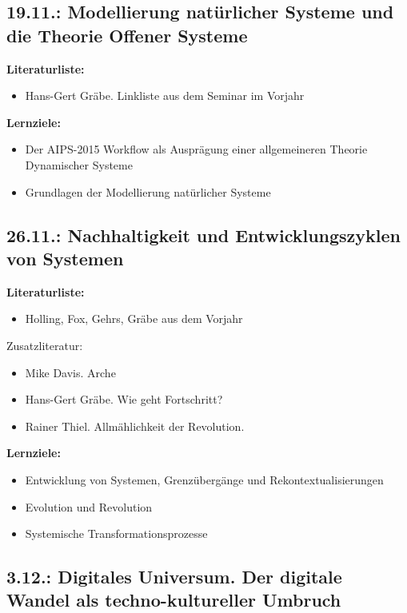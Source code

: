 \documentclass[11pt,a4paper]{article}
\begin{document}
\subsection{19.11.: Modellierung natürlicher Systeme und die Theorie Offener
  Systeme}

\textbf{Literaturliste:}
\begin{itemize}
\item Hans-Gert Gräbe. Linkliste aus dem Seminar im Vorjahr
\end{itemize}

\textbf{Lernziele:}
\begin{itemize}[noitemsep]
\item Der AIPS-2015 Workflow als Ausprägung einer allgemeineren Theorie
  Dynamischer Systeme 
\item Grundlagen der Modellierung natürlicher Systeme
\end{itemize}

\subsection{26.11.: Nachhaltigkeit und Entwicklungszyklen von Systemen}

\textbf{Literaturliste:}
\begin{itemize}[noitemsep]
\item Holling, Fox, Gehrs, Gräbe aus dem Vorjahr
\end{itemize}

Zusatzliteratur:
\begin{itemize}[noitemsep]
\item Mike Davis. Arche
\item Hans-Gert Gräbe. Wie geht Fortschritt?
\item Rainer Thiel. Allmählichkeit der Revolution.
\end{itemize}

\textbf{Lernziele:}
\begin{itemize}[noitemsep]
\item Entwicklung von Systemen, Grenzübergänge und Rekontextualisierungen 
\item Evolution und Revolution
\item Systemische Transformationsprozesse
\end{itemize}

\subsection{3.12.: Digitales Universum. Der digitale Wandel als
  techno-kultureller Umbruch}
\end{document}
